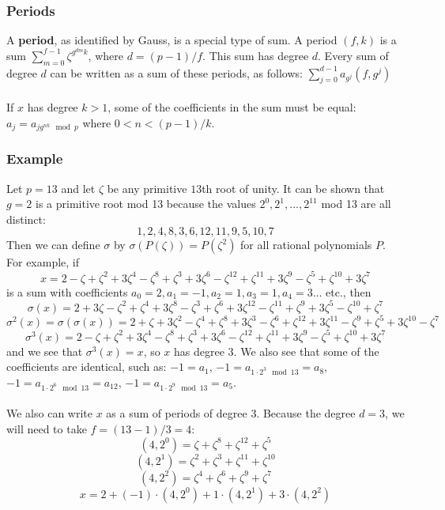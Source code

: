 \documentclass{article}
\begin{document}
        \subsubsection{Periods}
            A \textbf{period}, as identified by Gauss, is a special type of sum. A period $ (f, k) $ is a sum $ \sum_{m = 0}^{f - 1} \zeta^{g^{d m} k} $, where $ d = (p - 1)/f $. This sum has degree $ d $. Every sum of degree $ d $ can be written as a sum of these periods, as follows: $ \sum_{j = 0}^{d - 1} a_{g^j} (f, g^j) $\\
            \\
            If $ x $ has degree $ k > 1 $, some of the coefficients in the sum must be equal: $ a_j = a_{j g^{n k} \mod p} $ where $ 0 < n < (p - 1)/k $.\\
        \subsubsection{Example}
            Let $ p = 13 $ and let $ \zeta $ be any primitive $ 13 $th root of unity. It can be shown that $ g = 2 $ is a primitive root mod 13 because the values $ 2^0, 2^1, ..., 2^{11} $ mod 13 are all distinct:
            $$ 1, 2, 4, 8, 3, 6, 12, 11, 9, 5, 10, 7 $$
            Then we can define $ \sigma $ by $ \sigma(P(\zeta)) = P(\zeta^2) $ for all rational polynomials $ P $. For example, if
            $$ x = 2 - \zeta + \zeta^2 + 3\zeta^4 - \zeta^8 + \zeta^3 + 3\zeta^6 - \zeta^{12} + \zeta^{11} + 3\zeta^9 - \zeta^5 + \zeta^{10} + 3\zeta^7 $$
            is a sum with coefficients $ a_0 = 2, a_1 = -1, a_2 = 1, a_3 = 1, a_4 = 3... $ etc., then
            $$ \sigma(x) = 2 + 3\zeta - \zeta^2 + \zeta^4 + 3\zeta^8 - \zeta^3 + \zeta^6 + 3\zeta^{12} - \zeta^{11} + \zeta^9 + 3\zeta^5 - \zeta^{10} + \zeta^7 $$
            $$ \sigma^2(x) = \sigma(\sigma(x)) = 2 + \zeta + 3\zeta^2 - \zeta^4 + \zeta^8 + 3\zeta^3 - \zeta^6 + \zeta^{12} + 3\zeta^{11} - \zeta^9 + \zeta^5 + 3\zeta^{10} - \zeta^7 $$
            $$ \sigma^3(x) = 2 - \zeta + \zeta^2 + 3\zeta^4 - \zeta^8 + \zeta^3 + 3\zeta^6 - \zeta^{12} + \zeta^{11} + 3\zeta^9 - \zeta^5 + \zeta^{10} + 3\zeta^7 $$
            and we see that $ \sigma^3(x) = x $, so $ x $ has degree $ 3 $. We also see that some of the coefficients are identical, such as: $ -1 = a_1 $, $ -1 = a_{1 \cdot 2^3 \mod 13} = a_8 $, $ -1 = a_{1 \cdot 2^6 \mod 13} = a_{12} $, $ -1 = a_{1 \cdot 2^9 \mod 13} = a_5 $.\\
            \\
            We also can write $ x $ as a sum of periods of degree $ 3 $. Because the degree $ d = 3 $, we will need to take $ f = (13 - 1)/3 = 4 $:
            $$ (4, 2^0) = \zeta + \zeta^8 + \zeta^{12} + \zeta^5 $$
            $$ (4, 2^1) = \zeta^2 + \zeta^3 + \zeta^{11} + \zeta^{10} $$
            $$ (4, 2^2) = \zeta^4 + \zeta^6 + \zeta^9 + \zeta^7 $$
            $$ x = 2 + (-1) \cdot (4, 2^0) + 1 \cdot (4, 2^1) + 3 \cdot (4, 2^2) $$
\end{document}
